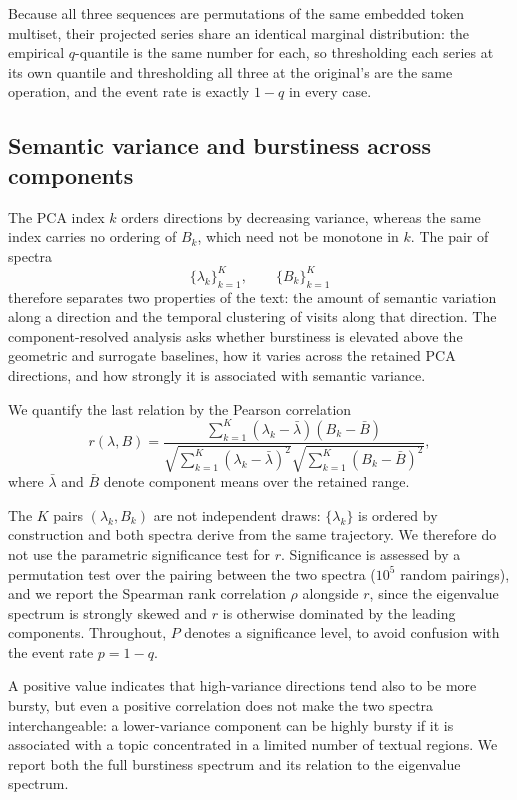 \documentclass[12pt,a4paper]{article}
\begin{document}
Because all three sequences are permutations of the same embedded token
multiset, their projected series share an identical marginal
distribution: the empirical $q$-quantile is the same number for each, so
thresholding each series at its own quantile and thresholding all three
at the original's are the same operation, and the event rate is exactly
$1-q$ in every case.
\subsection{Semantic variance and burstiness across components}
\label{sec:component_structure}

The PCA index $k$ orders directions by decreasing variance, 
whereas the same index carries no ordering of $B_k$, which need not be monotone in $k$.
The pair of spectra
\begin{equation}
  \{\lambda_k\}_{k=1}^K,
  \qquad
  \{B_k\}_{k=1}^K
  \label{eq:two_spectra}
\end{equation}
therefore separates two properties of the text: the amount of semantic
variation along a direction and the temporal clustering of visits along
that direction.
The component-resolved analysis asks whether burstiness is elevated
above the geometric and surrogate baselines, how it varies across the
retained PCA directions, and how strongly it is associated with
semantic variance.

We quantify the last relation by the Pearson correlation
\begin{equation}
  r(\lambda,B)=
  \frac{\sum_{k=1}^{K}(\lambda_k-\bar\lambda)(B_k-\bar B)}
  {\sqrt{\sum_{k=1}^{K}(\lambda_k-\bar\lambda)^2}
   \sqrt{\sum_{k=1}^{K}(B_k-\bar B)^2}},
  \label{eq:eigen_burst_corr}
\end{equation}
where $\bar\lambda$ and $\bar B$ denote component means over the retained
range.

The $K$ pairs $(\lambda_k,B_k)$ are not independent draws: $\{\lambda_k\}$
is ordered by construction and both spectra derive from the same
trajectory. We therefore do not use the parametric significance test for
$r$. Significance is assessed by a permutation test over the pairing
between the two spectra ($10^5$ random pairings), and we report the
Spearman rank correlation $\rho$ alongside $r$, since the eigenvalue
spectrum is strongly skewed and $r$ is otherwise dominated by the leading
components. Throughout, $P$ denotes a significance level, to avoid confusion with
the event rate $p=1-q$.


A positive value indicates that high-variance directions tend also to
be more bursty, but even a positive correlation does not make the two spectra interchangeable:
a lower-variance component can be highly bursty if it is
associated with a topic concentrated in a limited number of textual
regions.
We report both the full burstiness spectrum and its relation to the eigenvalue spectrum.
\end{document}
